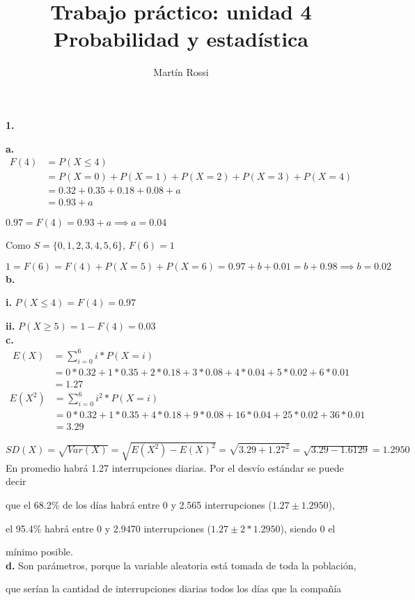 \documentclass[12pt,fleqn]{article}
\title{\LARGE \textbf{Trabajo práctico: unidad 4}\\\large Probabilidad y estadística}
\author{Martín Rossi}
\date{}
\begin{document}
\maketitle

\textbf{1.}

\textbf{a.}
\begin{align*}
  F(4)&=P(X \le 4)\\
      &=P(X=0)+P(X=1)+P(X=2)+P(X=3)+P(X=4)\\
      &=0.32+0.35+0.18+0.08+a\\
      &=0.93+a
\end{align*}

$0.97=F(4)=0.93+a \implies a=0.04$

Como $S=\{0,1,2,3,4,5,6\}$, $F(6)=1$

$1=F(6)=F(4)+P(X=5)+P(X=6)=0.97+b+0.01=b+0.98 \implies b=0.02$
\\

\textbf{b.}

\textbf{i.}
$P(X \le 4)=F(4)=0.97$

\textbf{ii.}
$P(X \ge 5)=1-F(4)=0.03$
\\

\textbf{c.}
\begin{align*}
  E(X)&=\sum_{i=0}^6 i*P(X=i)\\
      &=0*0.32+1*0.35+2*0.18+3*0.08+4*0.04+5*0.02+6*0.01\\
      &=1.27
\end{align*}
\begin{align*}
  E(X^2)&=\sum_{i=0}^6 i^2*P(X=i)\\
        &=0*0.32+1*0.35+4*0.18+9*0.08+16*0.04+25*0.02+36*0.01\\
        &=3.29
\end{align*}

$SD(X)=\sqrt{Var(X)}=\sqrt{E(X^2)-E(X)^2}=\sqrt{3.29+1.27^2}=\sqrt{3.29-1.6129}=1.2950$
\newpage
En promedio habrá 1.27 interrupciones diarias. Por el desvío estándar se puede decir

que el 68.2\% de los días habrá entre 0 y 2.565 interrupciones ($1.27 \pm 1.2950$),

el 95.4\% habrá entre 0 y 2.9470 interrupciones ($1.27 \pm 2*1.2950$), siendo 0 el

mínimo posible.
\\

\textbf{d.}
Son parámetros, porque la variable aleatoria está tomada de toda la población,

que serían la cantidad de interrupciones diarias todos los días que la compañía
\end{document}
